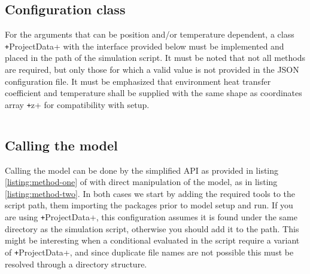 \documentclass[11pt]{paper}
\begin{document}
\subsection{Configuration class}

For the arguments that can be position and/or temperature dependent, a class \texttt+ProjectData+ with the interface provided below must be implemented and placed in the path of the simulation script. It must be noted that not all methods are required, but only those for which a valid value is not provided in the JSON configuration file. It must be emphasized that environment heat transfer coefficient and temperature shall be supplied with the same shape as coordinates array \texttt+z+ for compatibility with setup.

\inputminted{octave}{../sample/minified-for-dist/case-hanein-paper/ProjectData.m}

\subsection{Calling the model}

Calling the model can be done by the simplified API as provided in listing \ref{listing:method-one} of with direct manipulation of the model, as in listing \ref{listing:method-two}. In both cases we start by adding the required tools to the script path, them importing the packages prior to model setup and run. If you are using \texttt+ProjectData+, this configuration assumes it is found under the same directory as the simulation script, otherwise you should add it to the path. This might be interesting when a conditional evaluated in the script require a variant of \texttt+ProjectData+, and since duplicate file names are not possible this must be resolved through a directory structure.

\inputminted[firstline=11,lastline=21]{octave}{../sample/minified-for-dist/case-hanein-paper/simulate.m}

\inputminted[firstline=11,lastline=23]{octave}{../sample/minified-for-dist/case-kiln-alumina/simulate.m}
\end{document}
